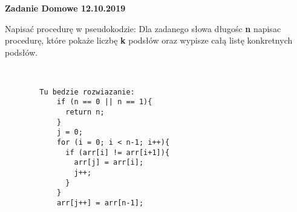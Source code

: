 		
		
		\begin{tcolorbox}
			\textbf{Zadanie Domowe 12.10.2019} \newline
			
			Napisać procedurę w pseudokodzie:
			Dla zadanego słowa długośc {\bf n} napisac procedurę, które pokaże liczbę {\bf k}
			podsłów oraz wypisze całą listę konkretnych podsłów.
		\end{tcolorbox}
		
		\begin{lstlisting}
		
		
		Tu bedzie rozwiazanie:
		    if (n == 0 || n == 1){    
		      return n;        
		    }        
		    j = 0;    
		    for (i = 0; i < n-1; i++){      
		      if (arr[i] != arr[i+1]){        
		        arr[j] = arr[i];       
		        j++;      
		      }       
		    }      
		    arr[j++] = arr[n-1];
		\end{lstlisting}
	
	
	
